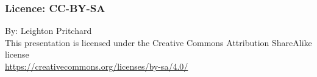 
%
\begin{frame}
  \frametitle{Licence: CC-BY-SA}
  By: Leighton Pritchard \\[0.5cm]
  This presentation is licensed under the Creative Commons Attribution ShareAlike license \\
  \href{https://creativecommons.org/licenses/by-sa/4.0/}{https://creativecommons.org/licenses/by-sa/4.0/}
\end{frame}